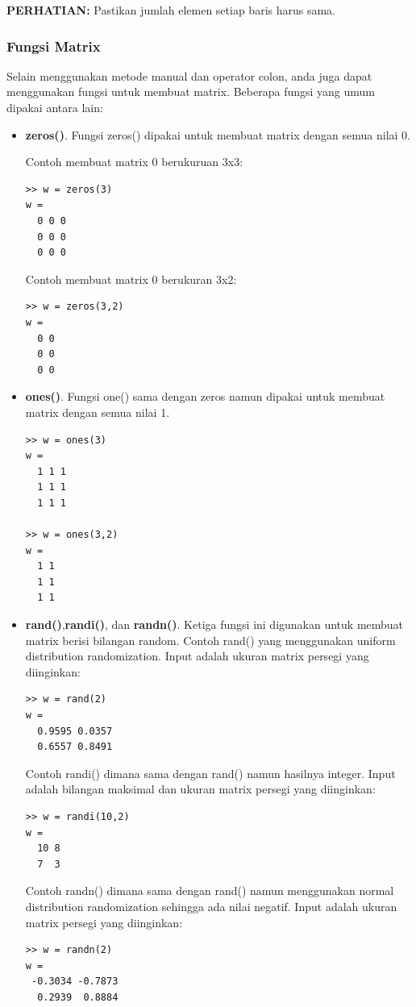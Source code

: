 \documentclass[12pt]{book}
\begin{document}
	\textbf{PERHATIAN:} Pastikan jumlah elemen setiap baris harus sama.

	\subsubsection{Fungsi Matrix}

	Selain menggunakan metode manual dan operator colon, anda juga dapat menggunakan fungsi untuk membuat matrix.
	Beberapa fungsi yang umum dipakai antara lain:
	\begin{itemize}
		\item \textbf{zeros()}. Fungsi zeros() dipakai untuk membuat matrix dengan semua nilai 0.

		Contoh membuat matrix 0 berukuruan 3x3:
		\begin{verbatim}
>> w = zeros(3)
w =
  0 0 0
  0 0 0
  0 0 0
		\end{verbatim}

		Contoh membuat matrix 0 berukuran 3x2:
		\begin{verbatim}
>> w = zeros(3,2)
w =
  0 0
  0 0
  0 0
		\end{verbatim}

		\item \textbf{ones()}. Fungsi one() sama dengan zeros namun dipakai untuk membuat matrix dengan semua nilai 1.
		\begin{verbatim}
>> w = ones(3)
w =
  1 1 1
  1 1 1
  1 1 1

>> w = ones(3,2)
w =
  1 1
  1 1
  1 1
		\end{verbatim}

		\item \textbf{rand()},\textbf{randi()}, dan \textbf{randn()}. Ketiga fungsi ini digunakan untuk membuat matrix berisi bilangan random.
		Contoh rand() yang menggunakan uniform distribution randomization. Input adalah ukuran matrix persegi yang diinginkan:
		\begin{verbatim}
>> w = rand(2)
w =
  0.9595 0.0357
  0.6557 0.8491
		\end{verbatim}

		Contoh randi() dimana sama dengan rand() namun hasilnya integer. Input adalah bilangan maksimal dan ukuran matrix persegi yang diinginkan:
		\newpage
		\begin{verbatim}
>> w = randi(10,2)
w =
  10 8
  7  3
	\end{verbatim}

	Contoh randn() dimana sama dengan rand() namun menggunakan normal distribution randomization sehingga ada nilai negatif.
	Input adalah ukuran matrix persegi yang diinginkan:
	\begin{verbatim}
>> w = randn(2)
w =
 -0.3034 -0.7873
  0.2939  0.8884
	\end{verbatim}

	\end{itemize}
\end{document}
